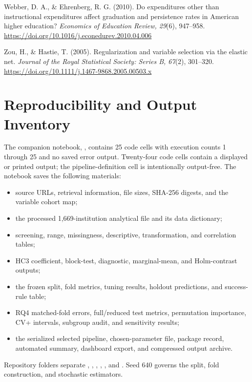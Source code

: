 \documentclass[12pt,a4paper]{article}
\begin{document}
Webber, D. A., \& Ehrenberg, R. G. (2010). Do expenditures other than instructional expenditures affect graduation and persistence rates in American higher education? \textit{Economics of Education Review, 29}(6), 947--958. \url{https://doi.org/10.1016/j.econedurev.2010.04.006}

Zou, H., \& Hastie, T. (2005). Regularization and variable selection via the elastic net. \textit{Journal of the Royal Statistical Society: Series B, 67}(2), 301--320. \url{https://doi.org/10.1111/j.1467-9868.2005.00503.x}\par
\endgroup

\clearpage
\appendix
\section{Reproducibility and Output Inventory}

The companion notebook, , contains 25 code cells with execution counts 1 through 25 and no saved error output. Twenty-four code cells contain a displayed or printed output; the pipeline-definition cell is intentionally output-free. The notebook saves the following materials:

\begin{itemize}[leftmargin=0.55in]
\item source URLs, retrieval information, file sizes, SHA-256 digests, and the variable cohort map;
\item the processed 1,669-institution analytical file and its data dictionary;
\item screening, range, missingness, descriptive, transformation, and correlation tables;
\item HC3 coefficient, block-test, diagnostic, marginal-mean, and Holm-contrast outputs;
\item the frozen split, fold metrics, tuning results, holdout predictions, and success-rule table;
\item RQ4 matched-fold errors, full/reduced test metrics, permutation importance, CV+ intervals, subgroup audit, and sensitivity results;
\item the serialized selected pipeline, chosen-parameter file, package record, automated summary, dashboard export, and compressed output archive.
\end{itemize}

Repository folders separate , , , , , and . Seed 640 governs the split, fold construction, and stochastic estimators.
\end{document}
